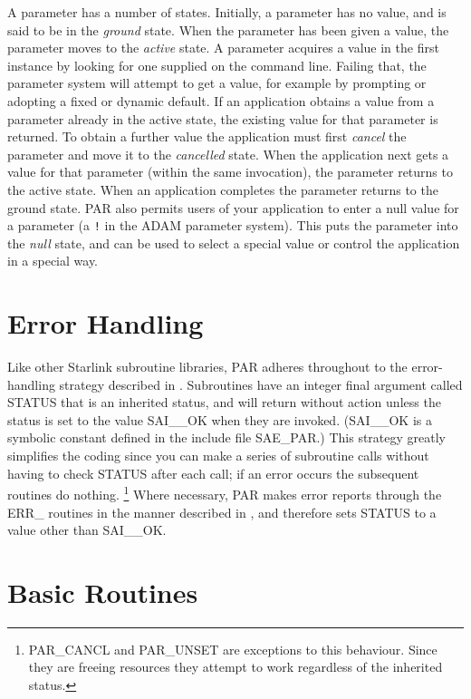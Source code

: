 \documentclass[twoside,11pt,nolof]{starlink}
\begin{document}
A parameter has a number of states.  Initially, a parameter has no
value, and is said to be in the \emph{ground\/} state.  When the
parameter has been given a value, the parameter moves to the \emph{active\/} state.  A parameter acquires a value in the first instance by
looking for one supplied on the command line.  Failing that, the
parameter system will attempt to get a value, for example by prompting
or adopting a fixed or dynamic default.  If an application obtains a
value from a parameter already in the active state, the existing value
for that parameter is returned.  To obtain a further value the
application must first \emph{cancel\/} the parameter and move it to the
\emph{cancelled\/} state.  When the application next gets a value for
that parameter (within the same invocation), the parameter returns to
the active state.  When an application completes the parameter returns
to the ground state. PAR also permits users of your application to enter
a null value for a parameter (a \texttt{!} in the {\footnotesize ADAM}
parameter system).  This puts the parameter into the \emph{null\/} state,
and can be used to select a special value or control the application in
a special way.

\section{Error Handling}
\label{se:error}

Like other Starlink subroutine libraries, PAR adheres throughout to the
error-handling strategy described in
.
Subroutines have an
integer final argument called STATUS that is an inherited status, and
will return without action unless the status is set to the value
SAI\_\_OK when they are invoked.  (SAI\_\_OK is a symbolic constant
defined in the include file SAE\_PAR.)  This strategy greatly simplifies
the coding since you can make a series of subroutine calls without
having to check STATUS after each call; if an error occurs the
subsequent routines do nothing. \footnote{PAR\_CANCL and PAR\_UNSET are
exceptions to this behaviour.  Since they are freeing resources they
attempt to work regardless of the inherited status.}  Where necessary,
PAR makes error reports through the ERR\_ routines in the manner
described in
, and therefore sets STATUS to a value other than
SAI\_\_OK.


\section{Basic Routines}
\end{document}
